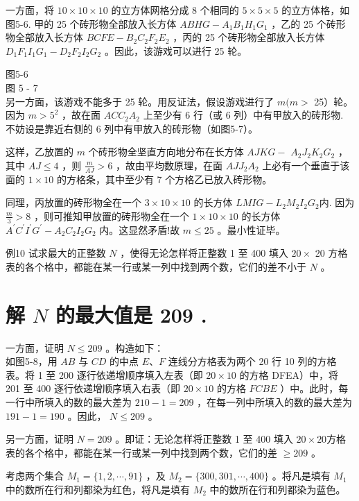 \documentclass[10pt]{article}
\begin{document}
一方面，将 $10 \times 10 \times 10$ 的立方体网格分成 8 个相同的 $5 \times 5 \times 5$ 的立方体格，如图5-6. 甲的 25 个砖形物全部放入长方体 $A B H G-A_{1} B_{1} H_{1} G_{1}$ ，乙的 25 个砖形物全部放入长方体 $B C F E-B_{2} C_{2} F_{2} E_{2}$ ，丙的 25 个砖形物全部放入长方体 $D_{1} F_{1} I_{1} G_{1}-D_{2} F_{2} I_{2} G_{2}$ 。因此，该游戏可以进行 25 轮。

图5-6\\
图 5 - 7\\
另一方面，该游戏不能多于 25 轮。用反证法，假设游戏进行了 $m(m>$ 25）轮。因为 $m>5^{2}$ ，故在面 $A C C_{2} A_{2}$ 上至少有 6 行（或 6 列）中有甲放入的砖形物. 不妨设是靠近右侧的 6 列中有甲放入的砖形物（如图5-7）。

这样，乙放置的 $m$ 个砖形物全坚直方向地分布在长方体 $A J K G-$ $A_{2} J_{2} K_{2} G_{2}$ ，其中 $A J \leqslant 4$ ，则 $\frac{m}{A J}>6$ ，故由平均数原理，在面 $A J J_{2} A_{2}$ 上必有一个垂直于该面的 $1 \times 10$ 的方格条，其中至少有 7 个方格乙已放入砖形物。

同理，丙放置的砖形物全在一个 $3 \times 10 \times 10$ 的长方体 $L M I G-L_{2} M_{2} I_{2} G_{2}$内. 因为 $\frac{m}{3}>8$ ，则可推知甲放置的砖形物全在一个 $1 \times 10 \times 10$ 的长方体 $A^{\prime} C^{\prime} I^{\prime} G^{\prime}-A_{2} C_{2} I_{2} G_{2}$ 内。这显然矛盾!故 $m \leqslant 25$ 。最小性证毕。

例10 试求最大的正整数 $N$ ，使得无论怎样将正整数 1 至 400 填入 $20 \times$ 20 方格表的各个格中，都能在某一行或某一列中找到两个数，它们的差不小于 $N$ 。

\section{解 $N$ 的最大值是 209 .}
一方面，证明 $N \leqslant 209$ 。构造如下：\\
如图5-8，用 $A B$ 与 $C D$ 的中点 $E 、 F$ 连线分方格表为两个 20 行 10 列的方格表。将 1 至 200 逐行依递增顺序填入左表（即 $20 \times 10$ 的方格 DFEA）中，将 201 至 400 逐行依递增顺序填入右表（即 $20 \times 10$ 的方格 $F C B E$ ）中。此时，每一行中所填入的数的最大差为 $210-1=209$ ，在每一列中所填入的数的最大差为 $191-1=190$ 。因此， $N \leqslant 209$ 。

另一方面，证明 $N=209$ 。即证：无论怎样将正整数 1 至 400 填入 $20 \times 20$方格表的各个格中，都能在某一行或某一列中找到两个数，它们的差 $\geqslant 209$ 。

考虑两个集合 $M_{1}=\{1,2, \cdots, 91\}$ ，及 $M_{2}=\{300,301, \cdots, 400\}$ 。将凡是填有 $M_{1}$ 中的数所在行和列都染为红色，将凡是填有 $M_{2}$ 中的数所在行和列都染为蓝色。
\end{document}
